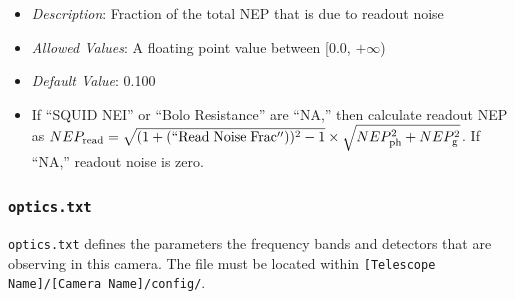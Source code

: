 \documentclass[11pt]{article} %
\begin{document}
\begin{itemize}[noitemsep,topsep=0pt]
\begin{itemize}[noitemsep,topsep=0pt]
		\item \textit{Description}: Fraction of the total NEP that is due to readout noise
		\item \textit{Allowed Values}: A floating point value between [0.0, $+\infty$) 
		\item \textit{Default Value}: 0.100
		\item If ``SQUID NEI'' or ``Bolo Resistance'' are ``NA,'' then calculate readout NEP as $NEP_{\mathrm{read}} = \sqrt{(1 + (\mathrm{``Read \; Noise \; Frac''}))^{2} - 1} \times \sqrt{NEP_{\mathrm{ph}}^{2} + NEP_{\mathrm{g}}^{2}}$. If ``NA,'' readout noise is zero.
		\end{itemize}
\end{itemize}


\subsubsection{\texttt{optics.txt}}

\texttt{optics.txt} defines the parameters the frequency bands and detectors that are observing in this camera. The file must be located within \texttt{[Telescope Name]/[Camera Name]/config/}.
\end{document}
